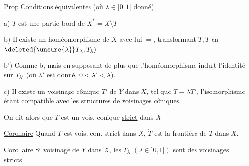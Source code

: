 \uline{Prop} Conditions équivalentes (où $\lambda\in]0,1[$ donné)

a) $\dot T$ est une partie-bord de $X^*=X\setminus\mathring T$

b) Il existe un homéomorphisme de $X$
avec lui-$=$, transformant $T,\dot T$ en
$\deleted{\unsure{\lambda}}T_\lambda,\dot T_\lambda)$

b') Comme b, mais en supposant de plus
que l'homéomorphisme induit l'identité
sur $T_{\lambda'}$ (où 
$\lambda'$ est donné, $0<\lambda'<\lambda$).

c) Il existe un voisinage  cônique $T'$
de $Y$ dans $X$,  tel que $T=\lambda T'$,
l'isomorphisme étant compatible avec les
structures de voisinages côniques.

On dit alors que $T$ est un vois.  conique
\uline{strict} dans $X$


\uline{Corollaire} Quand $T$ est vois.  con. strict dans $X$,
$\dot T$ est la frontière de $T$ dans $X$.

\uline{Corollaire} Si 
 voisinage
 de $Y$
dans $X$, les $T_\lambda$ $(\lambda\in]0,1[)$ sont des voisinages
 stricts

